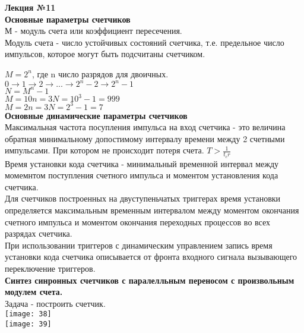 \LARGE{ \textbf {Лекция №11}}\\
\Large{ \textbf {Основные параметры счетчиков}}\\

М - модуль счета или коэффициент пересечения.\\
Модуль счета - число устойчивых состояний счетчика, т.е. предельное число импульсов,
которое могут быть подсчитаны счетчиком.

$M = 2^n $, где  n число разрядов для двоичных.\\
$ 0 \to 1 \to 2 \to ... \to 2^n-2 \to 2^n -1  $\\
$N = M^n  -1 $\\
$M = 10  n = 3 N = 10^3 - 1 = 999$\\
$M = 2  n = 3 N = 2^3 - 1 = 7$\\


\textbf{Основные динамические параметры счетчиков}\\
Максимальная частота посупления импульса на вход счетчика - это величина обратная
минимальному допостимому интервалу времени между 2 счетными импульсами.
При котором не происходит потеря счета.
$T > \frac{1}{t_cr}$\\
Время установки кода счетчика - минимальный временной интервал между момемнтом поступления
счетного импульса и моментом установления кода счетчика.\\

Для счетчиков построенных на двуступеньчатых триггерах время установки определяется максимальным
временным интервалом между моментом окончания счетного импульса и моментом окончания переходных процессов во всех разрядах счетчика.\\
При использовании триггеров с динамическим управлением запись время установки кода счетчика
описывается от фронта входного сигнала вызывающего переключение триггеров.\\
\textbf{Синтез синронных счетчиков с паралелльным переносом с произвольным модулем счета.}\\
Задача - построить счетчик.\\
\texttt{[image: 38]}\\
\texttt{[image: 39]}\\

